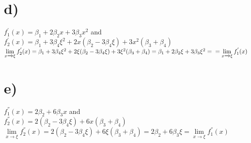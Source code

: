 \documentclass[12pt]{article}
\begin{document}
\section*{d)}
$f_1^{'}(x) = \beta_1 + 2\beta_2x + 3\beta_3x^2$ and \\ $f_2^{'}(x) = \beta_1 + 3\beta_4\xi^2 + 2x(\beta_2 - 3\beta_4\xi) + 3x^2(\beta_3 + \beta_4)$\vspace{0.3 cm}\newline
$\lim\limits_{x \xrightarrow{}\xi}f_2^{'}(x) = \beta_1 + 3\beta_4\xi^2 + 2\xi(\beta_2 - 3\beta_4\xi) + 3\xi^2(\beta_3 + \beta_4) = \beta_1 + 2\beta_2\xi + 3\beta_3\xi^2 = \\
 = \lim\limits_{x\xrightarrow{}\xi}f_1^{'}(x)$
 \section*{e)}
$f_1^{''}(x) = 2\beta_2 + 6\beta_3x$ and \\ $f_2^{''}(x) = 2(\beta_2 - 3\beta_4\xi) + 6x(\beta_3 + \beta_4)$\vspace{0.3 cm}\newline
$\lim\limits_{x \xrightarrow{}\xi}f_2^{''}(x) =  2(\beta_2 - 3\beta_4\xi) + 6\xi(\beta_3 + \beta_4) = 2\beta_2 + 6\beta_3\xi = \lim\limits_{x \xrightarrow{}\xi}f_1^{''}(x)$
\end{document}
